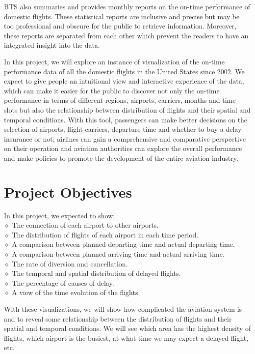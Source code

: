 \documentclass[12pt]{article}
\begin{document}
BTS also summaries and provides monthly reports on the on-time performance of domestic flights. These statistical reports are inclusive and precise but may be too professional and obscure for the public to retrieve information. Moreover, these reports are separated from each other which prevent the readers to have an integrated insight into the data.

In this project, we will explore an instance of visualization of the on-time performance data of all the domestic flights in the United States since 2002. We expect to give people an intuitional view and interactive experience of the data, which can make it easier for the public to discover not only the on-time performance in terms of different regions, airports, carriers, months and time slots but also the relationship between distribution of flights and their spatial and temporal conditions. With this tool, passengers can make better decisions on the selection of airports, flight carriers, departure time and whether to buy a delay insurance or not; airlines can gain a comprehensive and comparative perspective on their operation and aviation authorities can explore the overall performance and make policies to promote the development of the entire aviation industry.

\section{Project Objectives}
    \noindent In this project, we expected to show:\\
    $\diamond$ The connection of each airport to other airports.\\
    $\diamond$ The distribution of flights of each airport in each time period.\\
    $\diamond$ A comparison between planned departing time and actual departing time.\\
    $\diamond$ A comparison between planned arriving time and actual arriving time.\\
    $\diamond$ The rate of diversion and cancellation.\\
    $\diamond$ The temporal and spatial distribution of delayed flights.\\
    $\diamond$ The percentage of causes of delay.\\
    $\diamond$ A view of the time evolution of the flights.

    With these visualizations, we will show how complicated the aviation system is and to reveal some relationship between the distribution of flights and their spatial and temporal conditions. We will see which area has the highest density of flights, which airport is the busiest, at what time we may expect a delayed flight, etc.
\end{document}
